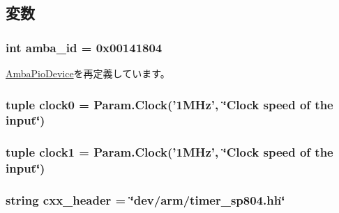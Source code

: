 \subsection{変数}
\hypertarget{classRealView_1_1Sp804_a38d7b9edfe6f0eea7a54e7e4f6253f3a}{
\subsubsection[{amba\_\-id}]{\setlength{\rightskip}{0pt plus 5cm}int {\bf amba\_\-id} = 0x00141804}}
\label{classRealView_1_1Sp804_a38d7b9edfe6f0eea7a54e7e4f6253f3a}


\hyperlink{classRealView_1_1AmbaPioDevice_ad9d2b9e37de5c1c7c10219fc1b834599}{AmbaPioDevice}を再定義しています。\hypertarget{classRealView_1_1Sp804_a68d3e128a09682ed8757b39abe2cc431}{
\subsubsection[{clock0}]{\setlength{\rightskip}{0pt plus 5cm}tuple {\bf clock0} = Param.Clock('1MHz', \char`\"{}Clock speed of the input\char`\"{})}}
\label{classRealView_1_1Sp804_a68d3e128a09682ed8757b39abe2cc431}
\hypertarget{classRealView_1_1Sp804_aae31cfd91316d3a739200ee894fa9633}{
\subsubsection[{clock1}]{\setlength{\rightskip}{0pt plus 5cm}tuple {\bf clock1} = Param.Clock('1MHz', \char`\"{}Clock speed of the input\char`\"{})}}
\label{classRealView_1_1Sp804_aae31cfd91316d3a739200ee894fa9633}
\hypertarget{classRealView_1_1Sp804_a17da7064bc5c518791f0c891eff05fda}{
\subsubsection[{cxx\_\-header}]{\setlength{\rightskip}{0pt plus 5cm}string {\bf cxx\_\-header} = \char`\"{}dev/arm/timer\_\-sp804.hh\char`\"{}}}
\label{classRealView_1_1Sp804_a17da7064bc5c518791f0c891eff05fda}


